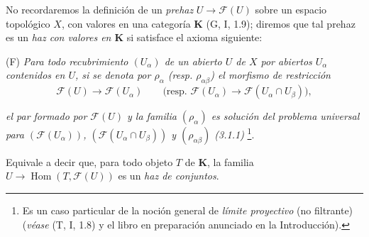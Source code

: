 \begin{env}[3.1.2]
\label{0.3.1.2-fr}
No recordaremos la definición de un \emph{prehaz}
$U\to\mathcal{F}(U)$ sobre un espacio topológico $X$, con valores en una
categoría $\boldsymbol{K}$ (G, I, 1.9); diremos que tal prehaz es un
\emph{haz con valores en $\boldsymbol{K}$} si satisface el axioma
siguiente:

\smallskip
\noindent
\textup{(F)} \emph{Para todo recubrimiento $(U_\alpha)$ de un abierto $U$ de $X$
por abiertos $U_\alpha$ contenidos en $U$, si se denota por $\rho_\alpha$
\textup{(resp. $\rho_{\alpha\beta}$)} el morfismo de restricción}
\[
  \mathcal{F}(U)\to\mathcal{F}(U_\alpha)
  \qquad
  \bigl(\text{resp. }\mathcal{F}(U_\alpha)
  \to\mathcal{F}(U_\alpha\cap U_\beta)\bigr),
\]


\emph{el par formado por $\mathcal{F}(U)$ y la familia $(\rho_\alpha)$ es
solución del problema universal para $(\mathcal{F}(U_\alpha))$,
$(\mathcal{F}(U_\alpha\cap U_\beta))$ y $(\rho_{\alpha\beta})$ \textup{(3.1.1)}}%
\footnote{Es un caso particular de la noción general de \emph{límite
proyectivo} (no filtrante) (\emph{véase} (T, I, 1.8) y el libro en preparación
anunciado en la Introducción).}.

Equivale a decir que, para todo objeto $T$ de $\boldsymbol{K}$, la
familia $U\to\operatorname{Hom}(T,\mathcal{F}(U))$ es un \emph{haz
de conjuntos}.
\end{env}


